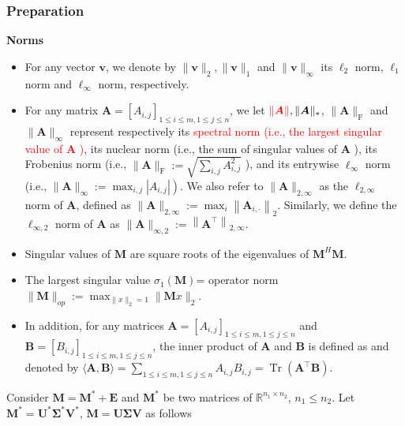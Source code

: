\documentclass[override]{beamer} %
\newcommand{\bi}{\begin{itemize} \scriptsize} \newcommand{\ei}{\end{itemize}}
\theoremstyle{remark}
\newcommand{\bs}[1]{{\boldsymbol{#1}^*}}
\newcommand{\bb}[1]{{\boldsymbol {#1}}}
\def\red{\textcolor{red}}
\begin{document}
\begin{frame}
\frametitle{Preparation}
\textbf{Norms}
\bi
\item For any vector $\boldsymbol{v}$, we denote by $\|\boldsymbol{v}\|_2,\|\boldsymbol{v}\|_1$ and $\|\boldsymbol{v}\|_{\infty}$ its $\ell_2$ norm, $\ell_1$ norm and $\ell_{\infty}$ norm, respectively. 

\item For any matrix $\boldsymbol{A}=\left[A_{i, j}\right]_{1 \leq i \leq m, 1 \leq j \leq n}$, we let $\red{\|\boldsymbol{A}\|},\|\boldsymbol{A}\|_*$, $\|\boldsymbol{A}\|_{\mathrm{F}}$ and $\|\boldsymbol{A}\|_{\infty}$ represent respectively its \red{spectral norm (i.e., the largest singular value of $\boldsymbol{A}$ )}, its nuclear norm (i.e., the sum of singular values of $\boldsymbol{A}$ ), its Frobenius norm (i.e., $\|\boldsymbol{A}\|_{\mathrm{F}}:=\sqrt{\sum_{i, j} A_{i, j}^2}$ ), and its entrywise $\ell_{\infty}$ norm (i.e., $\left.\|\boldsymbol{A}\|_{\infty}:=\max _{i, j}\left|A_{i, j}\right|\right)$. We also refer to $\|\boldsymbol{A}\|_{2, \infty}$ as the $\ell_{2, \infty}$ norm of $\boldsymbol{A}$, defined as $\|\boldsymbol{A}\|_{2, \infty}:=\max _i\left\|\boldsymbol{A}_{i, \cdot}\right\|_2$. Similarly, we define the $\ell_{\infty, 2}$ norm of $\boldsymbol{A}$ as $\|\boldsymbol{A}\|_{\infty, 2}:=\left\|\boldsymbol{A}^{\top}\right\|_{2, \infty}$.
\item Singular values of $\bb M$  are square roots of the eigenvalues of $\bb M^H \bb M$.
\item The largest singular value $\sigma_1(\bb M)$= operator norm $\|\bb M\|_{op} := \max_{\|x\|_2= 1} \|\bb Mx\|_2$.
\item In addition, for any matrices $\boldsymbol{A}=\left[A_{i, j}\right]_{1 \leq i \leq m, 1 \leq j \leq n}$ and $\boldsymbol{B}=\left[B_{i, j}\right]_{1 \leq i \leq m, 1 \leq j \leq n}$, the inner product of $\boldsymbol{A}$ and $\boldsymbol{B}$ is defined as and denoted by $\langle\boldsymbol{A}, \boldsymbol{B}\rangle=\sum_{1 \leq i \leq m, 1 \leq j \leq n} A_{i, j} B_{i, j}=\operatorname{Tr}\left(\boldsymbol{A}^{\top} \boldsymbol{B}\right)$.
\ei

Consider $\bb M = \bs M + \bb E$ and $\bs M$ be two matrices of $\mathbb R^{n_1\times n_2}$, $n_1\leq n_2$.
Let $\bs M = \bs U \bs \Sigma \bs V$, $\bb M = \bb U \bb \Sigma \bb V$ as follows


\end{frame}
\end{document}
